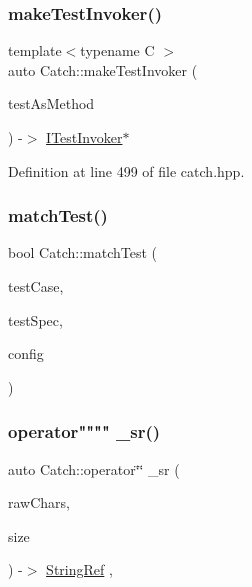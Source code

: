 \subsubsection{\texorpdfstring{make\+Test\+Invoker()}{makeTestInvoker()}\hspace{0.1cm}{\footnotesize\ttfamily [2/2]}}
{\footnotesize\ttfamily template$<$typename C $>$ \\
auto Catch\+::make\+Test\+Invoker (\begin{DoxyParamCaption}\item[{void(C\+::$\ast$)()}]{test\+As\+Method }\end{DoxyParamCaption}) -\/$>$ \mbox{\hyperlink{struct_catch_1_1_i_test_invoker}{I\+Test\+Invoker}}$\ast$ \hspace{0.3cm}{\ttfamily [noexcept]}}



Definition at line 499 of file catch.\+hpp.

\mbox{\label{namespace_catch_aadef80fbc6bc84589777a462770cef49}} 
\subsubsection{\texorpdfstring{match\+Test()}{matchTest()}}
{\footnotesize\ttfamily bool Catch\+::match\+Test (\begin{DoxyParamCaption}\item[{\mbox{\hyperlink{class_catch_1_1_test_case}{Test\+Case}} const \&}]{test\+Case,  }\item[{Test\+Spec const \&}]{test\+Spec,  }\item[{I\+Config const \&}]{config }\end{DoxyParamCaption})}

\mbox{\label{namespace_catch_a36bf2a7f244cdce2d6729e53658d2370}} 
\subsubsection{\texorpdfstring{operator"""" \+\_\+sr()}{operator"" \_sr()}}
{\footnotesize\ttfamily auto Catch\+::operator\char`\"{}\char`\"{} \+\_\+sr (\begin{DoxyParamCaption}\item[{char const $\ast$}]{raw\+Chars,  }\item[{std\+::size\+\_\+t}]{size }\end{DoxyParamCaption}) -\/$>$ \mbox{\hyperlink{class_catch_1_1_string_ref}{String\+Ref}} \hspace{0.3cm}{\ttfamily [inline]}, {\ttfamily [noexcept]}}




